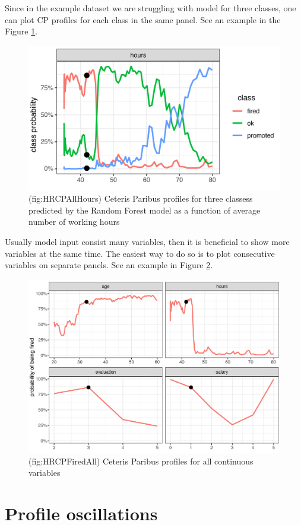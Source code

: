 \documentclass[]{book}
\theoremstyle{definition}
\theoremstyle{definition}
\theoremstyle{definition}
\theoremstyle{remark}
\begin{document}
Since in the example dataset we are struggling with model for three
classes, one can plot CP profiles for each class in the same panel. See
an example in the Figure \ref{fig:HRCPAllHours}.

\begin{figure}

{\centering \includegraphics[width=0.6\linewidth]{figure/HR_cp_all_hours} 

}

\caption{(fig:HRCPAllHours) Ceteris Paribus profiles for three classess predicted by the Random Forest model as a function of average number of working hours}\label{fig:HRCPAllHours}
\end{figure}

Usually model input consist many variables, then it is beneficial to
show more variables at the same time. The easiest way to do so is to
plot consecutive variables on separate panels. See an example in Figure
\ref{fig:HRCPFiredAll}.

\begin{figure}

{\centering \includegraphics[width=0.7\linewidth]{figure/HR_cp_fired_all} 

}

\caption{(fig:HRCPFiredAll) Ceteris Paribus profiles for all continuous variables}\label{fig:HRCPFiredAll}
\end{figure}

\hypertarget{oscillations}{%
\section{Profile oscillations}\label{oscillations}}
\end{document}
